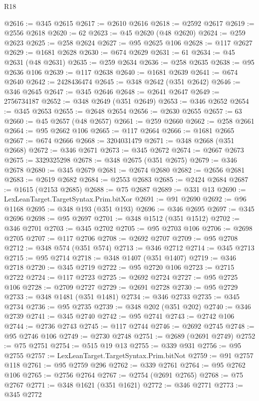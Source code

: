 \begin{lexlean}{R18}
\begin{coremodule}
@2616 := @345 @2615
@2617 := @2610 @2616
@2618 := @2592 @2617
@2619 := @2556 @2618
@2620 := 62
@2623 := @45 @2620 (@48 @2620)
@2624 := @259 @2623
@2625 := @258 @2624
@2627 := @95 @2625 @106
@2628 := @117 @2627
@2629 := @1681 @2628
@2630 := @674 @2629
@2631 := 61
@2634 := @45 @2631 (@48 @2631)
@2635 := @259 @2634
@2636 := @258 @2635
@2638 := @95 @2636 @106
@2639 := @117 @2638
@2640 := @1681 @2639
@2641 := @674 @2640
@2642 := 2428436474
@2645 := @348 @2642 (@351 @2642)
@2646 := @346 @2645
@2647 := @345 @2646
@2648 := @2641 @2647
@2649 := 2756734187
@2652 := @348 @2649 (@351 @2649)
@2653 := @346 @2652
@2654 := @345 @2653
@2655 := @2648 @2654
@2656 := @2630 @2655
@2657 := 63
@2660 := @45 @2657 (@48 @2657)
@2661 := @259 @2660
@2662 := @258 @2661
@2664 := @95 @2662 @106
@2665 := @117 @2664
@2666 := @1681 @2665
@2667 := @674 @2666
@2668 := 3204031479
@2671 := @348 @2668 (@351 @2668)
@2672 := @346 @2671
@2673 := @345 @2672
@2674 := @2667 @2673
@2675 := 3329325298
@2678 := @348 @2675 (@351 @2675)
@2679 := @346 @2678
@2680 := @345 @2679
@2681 := @2674 @2680
@2682 := @2656 @2681
@2683 := @2619 @2682
@2684 := @2553 @2683
@2685 := @2424 @2684
@2687 := @1615 (@2153 @2685)
@2688 := @75 @2687
@2689 := @331 @13
@2690 := LexLeanTarget.TargetSyntax.Prim.bitXor
@2691 := @91 @2690
@2692 := @96 @1168
@2695 := @348 @193 (@351 @193)
@2696 := @346 @2695
@2697 := @345 @2696
@2698 := @95 @2697
@2701 := @348 @1512 (@351 @1512)
@2702 := @346 @2701
@2703 := @345 @2702
@2705 := @95 @2703 @106
@2706 := @2698 @2705
@2707 := @117 @2706
@2708 := @2692 @2707
@2709 := @95 @2708
@2712 := @348 @574 (@351 @574)
@2713 := @346 @2712
@2714 := @345 @2713
@2715 := @95 @2714
@2718 := @348 @1407 (@351 @1407)
@2719 := @346 @2718
@2720 := @345 @2719
@2722 := @95 @2720 @106
@2723 := @2715 @2722
@2724 := @117 @2723
@2725 := @2692 @2724
@2727 := @95 @2725 @106
@2728 := @2709 @2727
@2729 := @2691 @2728
@2730 := @95 @2729
@2733 := @348 @1481 (@351 @1481)
@2734 := @346 @2733
@2735 := @345 @2734
@2736 := @95 @2735
@2739 := @348 @202 (@351 @202)
@2740 := @346 @2739
@2741 := @345 @2740
@2742 := @95 @2741
@2743 := @2742 @106
@2744 := @2736 @2743
@2745 := @117 @2744
@2746 := @2692 @2745
@2748 := @95 @2746 @106
@2749 := @2730 @2748
@2751 := @2689 (@2691 @2749)
@2752 := @75 @2751
@2754 := @515 @19 @13
@2755 := @339 @931
@2756 := @95 @2755
@2757 := LexLeanTarget.TargetSyntax.Prim.bitNot
@2759 := @91 @2757 @118
@2761 := @95 @2759 @296
@2762 := @339 @2761
@2764 := @95 @2762 @106
@2765 := @2756 @2764
@2767 := @2754 (@2691 @2765)
@2768 := @75 @2767
@2771 := @348 @1621 (@351 @1621)
@2772 := @346 @2771
@2773 := @345 @2772

\end{coremodule}
\end{lexlean}
